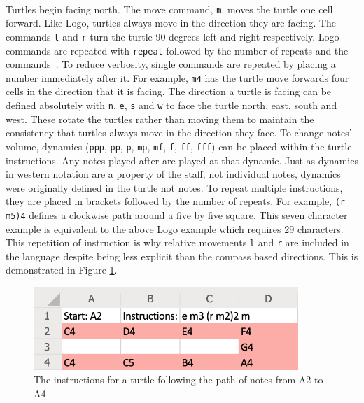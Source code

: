 \paragraph{} Turtles begin facing north. The move command, \texttt{m}, moves the turtle one cell forward. Like Logo, turtles always move in the direction they are facing. The commands \texttt{l} and \texttt{r} turn the turtle 90 degrees left and right respectively. Logo commands are repeated with \texttt{repeat} followed by the number of repeats and the commands~\cite{goldman:turtle}. To reduce verbosity, single commands are repeated by placing a number immediately after it. For example, \texttt{m4} has the turtle move forwards four cells in the direction that it is facing. The direction a turtle is facing can be defined absolutely with \texttt{n}, \texttt{e}, \texttt{s} and \texttt{w} to face the turtle north, east, south and west. These rotate the turtles rather than moving them to maintain the consistency that turtles always move in the direction they face. To change notes' volume, dynamics (\texttt{ppp}, \texttt{pp}, \texttt{p}, \texttt{mp}, \texttt{mf}, \texttt{f}, \texttt{ff}, \texttt{fff}) can be placed within the turtle instructions. Any notes played after are played at that dynamic. Just as dynamics in western notation are a property of the staff, not individual notes, dynamics were originally defined in the turtle not notes. To repeat multiple instructions, they are placed in brackets followed by the number of repeats. For example, \texttt{(r m5)4}  defines a clockwise path around a five by five square. This seven character example is equivalent to the above Logo example which requires 29 characters. This repetition of instruction is why relative movements \texttt{l} and \texttt{r} are included in the language despite being less explicit than the compass based directions. This is demonstrated in Figure \ref{prep:language1}.

\begin{figure}[ht]
  \centerline{\includegraphics[width=100mm]{figs/diss1.png}}
\caption{The instructions for a turtle following the path of notes from A2 to A4}
\label{prep:language1}
\end{figure}

